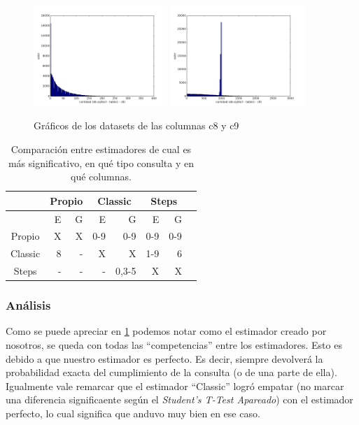 
\begin{figure}[h!]
  \centering
  \includegraphics[width=0.45\textwidth]{./images/c8}
  \includegraphics[width=0.45\textwidth]{./images/c9}
  \caption{Gráficos de los datasets de las columnas c8 y c9}
 \end{figure}
 
 

\newpage

\begin{table}[h!t]
\centering %
\begin{tabular}{c rrrrrrr} %
\hline\hline %
\ &\multicolumn{2}{c}{Propio}& \multicolumn{2}{c}{Classic}& \multicolumn{2}{c}{Steps} \\ [0.5ex] 
\hline %
 & E & G & E & G & E & G &  \\  
\hline
Propio &X  &X  &0-9 &0-9 &0-9 &0-9 \\ %
\hline
Classic &8  &-  &X &X &1-9 &6 \\
\hline
Steps &-  &- &- &0,3-5 &X &X  \\[1ex] %
\hline %
\end{tabular}
\caption{Comparación entre estimadores de cual es más significativo, en qué tipo consulta y en qué columnas. } %
\label{tab:hresult}
\end{table}

\subsubsection*{Análisis}
Como se puede apreciar en \ref{tab:hresult} podemos notar como el estimador creado por nosotros, se queda con todas las ``competencias'' entre los estimadores. Esto es debido a que nuestro estimador es perfecto. Es decir, siempre devolverá la probabilidad exacta del cumplimiento de la consulta (o de una parte de ella). Igualmente vale remarcar que el estimador ``Classic'' logró empatar (no marcar una diferencia significaente según el \textit{Student’s T-Test Apareado}) con el estimador perfecto, lo cual significa que anduvo muy bien en ese caso.
